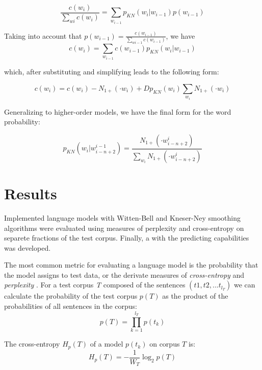 \documentclass[twoside]{article}
\begin{document}
\begin{multicols}{2}
\begin{equation}
\frac{c(w_{i})}{\sum_{w{i}} c(w_{i})} = \sum_{w_{i-1}} p_{KN}(w_{i} | w_{i-1} )p(w_{i-1})
\end{equation}

Taking into account that $p(w_{i-1}) =\frac{c(w_{i-1})}{\sum_{w{i-1}} c(w_{i-1})} $, we have
\begin{equation}
c(w_{i}) = \sum_{w_{i-1}} c(w_{i-1}) p_{KN}(w_{i} | w_{i-1})
\end{equation}

which, after substituting and simplifying leads to the following form:

\begin{equation}
c(w_{i}) = c(w_{i}) - N_{1+}(\cdot w_{i}) + D p_{KN}(w_{i}) \sum_{w_{i}} N_{1+}(\cdot w_{i})
\end{equation}

Generalizing to higher-order models, we have the final form for the word probability:

\begin{equation}
p_{KN}(w_{i} | w_{i-n+2}^{i-1}) = \frac{N_{1+}(\cdot w_{i-n+2}^{i})}{\sum_{w_{i}}N_{1+}(\cdot w_{i-n+2}^{i})} 
\end{equation}

\section{Results}
Implemented language models with Witten-Bell and Kneser-Ney smoothing algorithms were evaluated using measures of perplexity and cross-entropy on separete fractions of the test corpus. Finally, a  with the predicting capabilities was developed.


The most common metric for evaluating a language model is the probability that the model assigns to test data, or the derivate measures of \textit{cross-entropy} and \textit{perplexity} \cite{1_chen1999empirical}. For a test corpus \textit{T} composed of the sentences $(t1, t2 , ... t_{l_{T}})$ we can calculate the probability of the test corpus $p(T)$ as the product of the probabilities of all sentences in the corpus:
\begin{equation}
p(T) = \prod_{k=1}^{l_{T}} p(t_{k})
\end{equation}

The cross-entropy $H_{p}(T)$ of a model $p(t_{k})$ on corpus $T$ is:
\begin{equation}
H_{p}(T) = - \frac{1}{W_{T}} \log_{2} p(T)
\end{equation}


\end{multicols}
\end{document}
